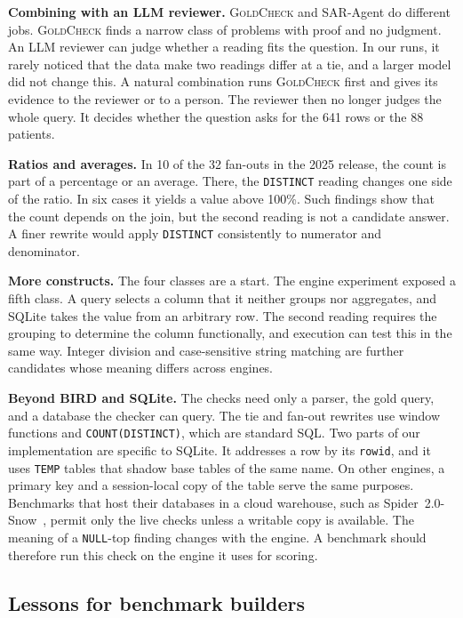 \documentclass[conference]{IEEEtran}
\newcommand{\sys}{\textsc{GoldCheck}}
\begin{document}
\textbf{Combining with an LLM reviewer.} \sys{} and SAR-Agent do different jobs.
\sys{} finds a narrow class of problems with proof and no judgment. An LLM
reviewer can judge whether a reading fits the question. In our runs, it rarely noticed that the data make two readings differ at a tie, and a larger model did not change this. A natural combination runs \sys{}
first and gives its evidence to the reviewer or to a person. The reviewer then no
longer judges the whole query. It decides whether the question asks for the 641
rows or the 88 patients.

\textbf{Ratios and averages.} In 10 of the 32 fan-outs in the 2025 release, the
count is part of a percentage or an average. There, the \texttt{DISTINCT}
reading changes one side of the ratio. In six cases it yields a value above
100\%. Such findings show that the count depends on the join, but the second
reading is not a candidate answer. A finer rewrite would apply \texttt{DISTINCT}
consistently to numerator and denominator.

\textbf{More constructs.} The four classes are a start. The engine experiment
exposed a fifth class. A query selects a column that
it neither groups nor aggregates, and SQLite takes the value from an arbitrary
row. The second reading requires the grouping to determine the column
functionally, and execution can test this in the same way. Integer division and
case-sensitive string matching are further candidates whose meaning differs
across engines.

\textbf{Beyond BIRD and SQLite.} The checks need only a parser, the gold query, and
a database the checker can query. The tie and fan-out rewrites use window
functions and \texttt{COUNT(DISTINCT)}, which are standard SQL. Two
parts of our implementation are specific to SQLite. It addresses a row by its
\texttt{rowid}, and it uses \texttt{TEMP} tables that shadow base tables of the
same name. On other engines, a primary key and a session-local copy of the table
serve the same purposes. Benchmarks that host their databases in a cloud
warehouse, such as Spider~2.0-Snow~\cite{lei2025spider2}, permit only the live
checks unless a writable copy is available. The meaning of a \texttt{NULL}-top
finding changes with the engine. A benchmark should
therefore run this check on the engine it uses for scoring.

\subsection{Lessons for benchmark builders}
\label{sec:lessons}
\end{document}
